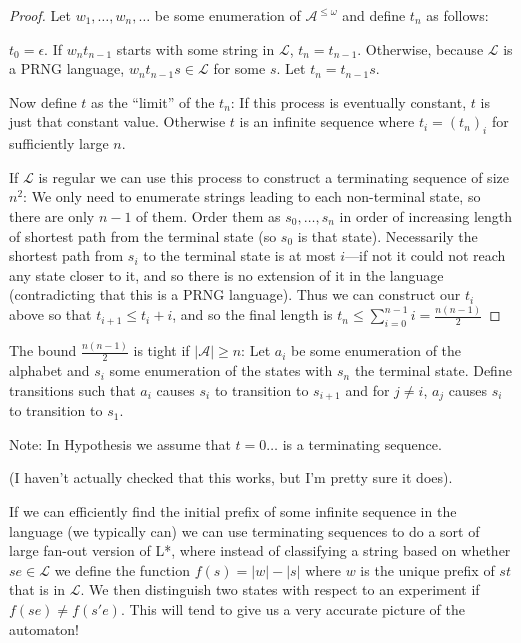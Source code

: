\begin{proof}
Let \(w_1, \ldots, w_n, \ldots\) be some enumeration of \(\mathcal{A}^{\leq \omega}\) and define \(t_n\) as follows:

\(t_0 = \epsilon\).
If \(w_n t_{n - 1}\) starts with some string in \(\mathcal{L}\),
\(t_n = t_{n - 1}\).
Otherwise,
because \(\mathcal{L}\) is a PRNG language,
\(w_n t_{n - 1} s \in \mathcal{L}\) for some \(s\).
Let \(t_n = t_{n - 1} s\).

Now define \(t\) as the ``limit'' of the \(t_n\):
If this process is eventually constant, \(t\) is just that constant value.
Otherwise \(t\) is an infinite sequence where \(t_i = {(t_n)}_i\) for sufficiently large \(n\).

If \(\mathcal{L}\) is regular we can use this process to construct a terminating sequence of size \(n^2\):
We only need to enumerate strings leading to each non-terminal state,
so there are only \(n - 1\) of them.
Order them as \(s_0, \ldots, s_n\) in order of increasing length of shortest path from the terminal state (so \(s_0\) is that state).
Necessarily the shortest path from \(s_i\) to the terminal state is at most \(i\)---if not it could not reach any state closer to it,
and so there is no extension of it in the language (contradicting that this is a PRNG language).
Thus we can construct our \(t_i\) above so that \(t_{i + 1} \leq t_i + i\),
and so the final length is \(t_n \leq \sum\limits_{i = 0}^{n - 1} i = \frac{n(n - 1)}{2}\)

\end{proof}

The bound \(\frac{n(n - 1)}{2}\) is tight if \(|\mathcal{A}| \geq n\):
Let \(a_i\) be some enumeration of the alphabet and \(s_i\) some enumeration of the states with \(s_n\) the terminal state.
Define transitions such that \(a_i\) causes \(s_i\) to transition to \(s_{i + 1}\) and for \(j \neq i\),
\(a_j\) causes \(s_i\) to transition to \(s_1\).

Note: In Hypothesis we assume that \(t = 0\ldots\) is a terminating sequence.

(I haven't actually checked that this works, but I'm pretty sure it does).

If we can efficiently find the initial prefix of some infinite sequence in the language (we typically can) we can use terminating sequences to do a sort of large fan-out version of L*,
where instead of classifying a string based on whether \(se \in \mathcal{L}\) we define the function \(f(s) = |w| - |s|\) where \(w\) is the unique prefix of \(st\) that is in \(\mathcal{L}\).
We then distinguish two states with respect to an experiment if \(f(se) \neq f(s'e)\).
This will tend to give us a very accurate picture of the automaton!

